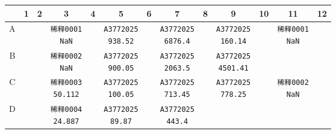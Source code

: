 \documentclass[UTF8,10pt,a4paper,fontset=fandol]{ctexart}
\newcommand{\fieldvalue}[1]{#1}
\begin{document}
\begin{center}
\small
\begin{tabular}{c|*{12}{c|}}
 &1&2&3&4&5&6&7&8&9&10&11&12\\ \hline
A&&&
\fieldvalue{\texttt{稀释0001\\NaN}}&&
\fieldvalue{\texttt{A3772025\\938.52}}&&
\fieldvalue{\texttt{A3772025\\6876.4}}&&
\fieldvalue{\texttt{A3772025\\160.14}}&&
\fieldvalue{\texttt{稀释0001\\NaN}}\\ \hline
B&&&
\fieldvalue{\texttt{稀释0002\\NaN}}&&
\fieldvalue{\texttt{A3772025\\900.05}}&&
\fieldvalue{\texttt{A3772025\\2063.5}}&&
\fieldvalue{\texttt{A3772025\\4501.41}}&&&&\\ \hline
C&&&
\fieldvalue{\texttt{稀释0003\\50.112}}&&
\fieldvalue{\texttt{A3772025\\100.05}}&&
\fieldvalue{\texttt{A3772025\\713.45}}&&
\fieldvalue{\texttt{A3772025\\778.25}}&&
\fieldvalue{\texttt{稀释0002\\NaN}}\\ \hline
D&&&
\fieldvalue{\texttt{稀释0004\\24.887}}&&
\fieldvalue{\texttt{A3772025\\89.87}}&&
\fieldvalue{\texttt{A3772025\\443.4}}&&

\end{tabular}
\end{center}
\end{document}
